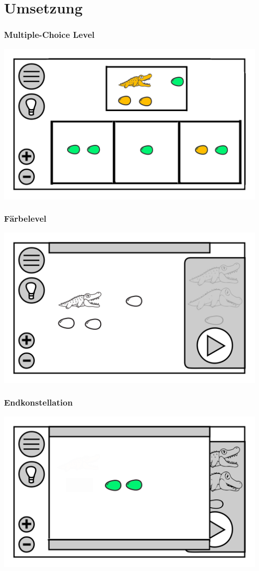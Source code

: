 \documentclass[t]{beamer}
\begin{document}
\section{Umsetzung}
\begin{frame}
	\frametitle{Multiple-Choice Level}
	\includegraphics[height=\textheight]{level_choice.png}
\end{frame}
\begin{frame}
	\frametitle{Färbelevel}
	\includegraphics[height=\textheight]{level_white.png}
\end{frame}
\begin{frame}
	\frametitle{Endkonstellation}
	\includegraphics[height=\textheight]{level_end.png}
\end{frame}
\end{document}
